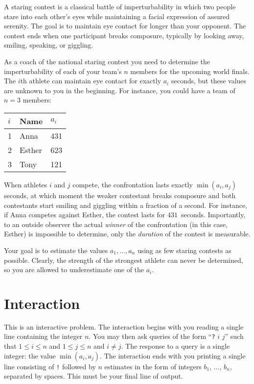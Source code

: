 

\noindent
A staring contest is a classical battle of imperturbability in which two people stare into each other's eyes while maintaining a facial expression of assured serenity.
The goal is to maintain eye contact for longer than your opponent.
The contest ends when one participant breaks composure, typically by looking away, smiling, speaking, or giggling.

As a coach of the national staring contest you need to determine the imperturbability of each of your team's $n$ members for the upcoming world finals.
The $i$th athlete can maintain eye contact for exactly $a_i$ seconds, but these values are unknown to you in the beginning.
For instance, you could have a team of $n=3$ members:

\medskip
\begin{tabular}{lll}
  $i$ & Name & $a_i$\\\hline
  1 & Anna &  431 \\
  2 & Esther & 623 \\
  3 & Tony &  121\\
\end{tabular}

\medskip
When athletes $i$ and $j$ compete, the confrontation lasts exactly $\min(a_i, a_j)$ seconds, at which moment the weaker contestant breaks composure and both contestants start smiling and giggling within a fraction of a second.
For instance, if Anna competes against Esther, the contest lasts for $431$~seconds.
Importantly, to an outside observer the actual \emph{winner} of the confrontation (in this case, Esther) is impossible to determine, only the \emph{duration} of the contest is measurable.

Your goal is to estimate the values $a_1,\ldots, a_n$ using as few staring contests as possible.
Clearly, the strength of the strongest athlete can never be determined, so you are allowed to underestimate one of the $a_i$.

\section*{Interaction}

This is an interactive problem.
The interaction begins with you reading a single line containing the integer $n$.
You may then ask queries of the form ``\texttt{?} $i$ $j$'' such that $1\leq i\leq n$ and $1\leq j\leq n$ and $i\neq j$.
The response to a query is a single integer: the value $\min(a_i, a_j)$.
The interaction ends with you printing a single line consisting of \texttt{!} followed by $n$ estimates in the form of integers $b_1$, $\ldots$, $b_n$, separated by spaces.
This must be your final line of output.

